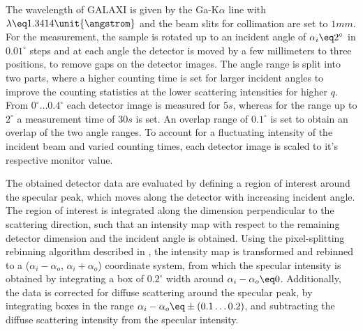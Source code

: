 \documentclass[\main/dresen_thesis.tex]{subfiles}
\begin{document}
    The wavelength of GALAXI is given by the Ga-K$\alpha$ line with $\lambda \eq 1.3414 \unit{\angstrom}$ and the beam slits for collimation are set to $1 \unit{mm}$.
    For the measurement, the sample is rotated up to an incident angle of $\alpha_i \eq 2^\circ$ in $0.01 ^\circ$ steps and at each angle the detector is moved by a few millimeters to three positions, to remove gaps on the detector images.
    The angle range is split into two parts, where a higher counting time is set for larger incident angles to improve the counting statistics at the lower scattering intensities for higher $q$.
    From $0 ^\circ \ldots 0.4 ^\circ$ each detector image is measured for $5 \unit{s}$, whereas for the range up to $2 ^\circ$ a measurement time of $30 \unit{s}$ is set.
    An overlap range of $0.1 ^\circ$ is set to obtain an overlap of the two angle ranges.
    To account for a fluctuating intensity of the incident beam and varied counting times, each detector image is scaled to it's respective monitor value.

    The obtained detector data are evaluated by defining a region of interest around the specular peak, which moves along the detector with increasing incident angle.
    The region of interest is integrated along the dimension perpendicular to the scattering direction, such that an intensity map with respect to the remaining detector dimension and the incident angle is obtained.
    Using the pixel-splitting rebinning algorithm described in , the intensity map is transformed and rebinned to a ($\alpha_i - \alpha_o$, $\alpha_i+\alpha_o$) coordinate system, from which the specular intensity is obtained by integrating a box of $0.2 ^\circ$ width around $\alpha_i - \alpha_o \eq 0$.
    Additionally, the data is corrected for diffuse scattering around the specular peak, by integrating boxes in the range $\alpha_i - \alpha_o \eq \pm (0.1 \ldots 0.2)$, and subtracting the diffuse scattering intensity from the specular intensity.
\end{document}
